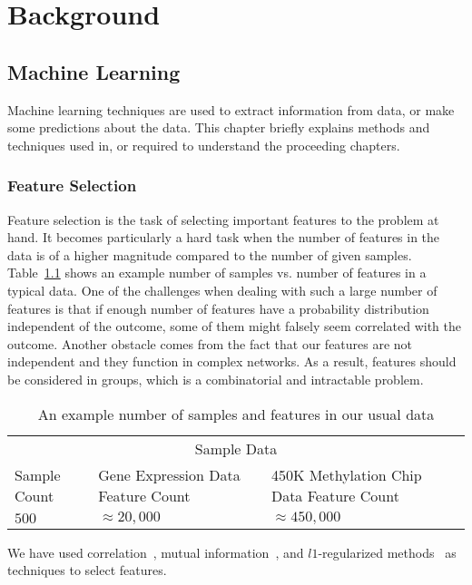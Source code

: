 \chapter{Background}

\section{Machine Learning}
Machine learning techniques are used to extract information from data, or make some predictions about the data. This chapter briefly explains methods and techniques used in, or required to understand the proceeding chapters.

\subsection{Feature Selection}
Feature selection is the task of selecting important features to the problem at hand. It becomes particularly a hard task when the number of features in the data is of a higher magnitude compared to the number of given samples. Table~\ref{tab:sample-sample-size} shows an example number of samples vs. number of features in a typical data. One of the challenges when dealing with such a large number of features is that if enough number of features have a probability distribution independent of the outcome, some of them might falsely seem correlated with the outcome. Another obstacle comes from the fact that our features are not independent and they function in complex networks. As a result, features should be considered in groups, which is a combinatorial and intractable problem.

\begin{table}[th!]
  \centering
  \begin{tabular}{p{3cm} p{3.5cm} p{4cm}}
    \hline
    \multicolumn{3}{c}{Sample Data} \\
    \cline{1-3}
    Sample Count   & Gene Expression Data Feature Count & 450K Methylation Chip Data Feature Count \\
    \hline
    $500$      & $\approx 20,000$    & $\approx 450,000$   \\
    \hline
  \end{tabular}
  \caption{An example number of samples and features in our usual data}
  \label{tab:sample-sample-size}
\end{table}

We have used correlation~\cite{correlation}, mutual information~\cite{mutual-information}, and $l1$-regularized methods~\cite{l1-regularized} as techniques to select features.

